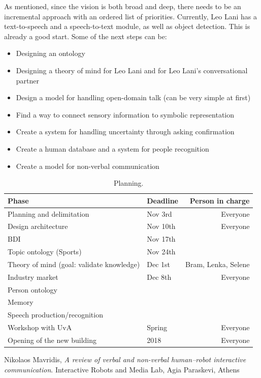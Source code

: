 \documentclass[a4paper]{article}
\begin{document}
As mentioned, since the vision is both broad and deep, there needs to be an incremental approach with an ordered list of priorities. Currently, Leo Lani has a text-to-speech and a speech-to-text module, as well as object detection. This is already a good start. Some of the next steps can be:
\begin{itemize}
\item Designing an ontology
\item Designing a theory of mind for Leo Lani and for Leo Lani's conversational partner
\item Design a model for handling open-domain talk (can be very simple at first)
\item Find a way to connect sensory information to symbolic representation
\item Create a system for handling uncertainty through asking confirmation
\item Create a human database and a system for people recognition 
\item Create a model for non-verbal communication


\end{itemize}
\begin{table}[h]
\centering
\begin{tabular}{|l|l|r|}
Phase & Deadline & Person in charge \\\hline
Planning and delimitation & Nov 3rd & Everyone  \\
Design architecture & Nov 10th & Everyone \\
BDI & Nov 17th & \\
Topic ontology (Sports) & Nov 24th & \\
Theory of mind (goal: validate knowledge) & Dec 1st & Bram, Lenka, Selene \\ 
Industry market & Dec 8th & Everyone \\
Person ontology & & \\
Memory & & \\
Speech production/recognition & & \\
Workshop with UvA & Spring &  Everyone \\
Opening of the new building & 2018 & Everyone \\
\end{tabular}
\caption{\label{tab:planning} Planning.}
\end{table}

\newpage

\begin{thebibliography}{9}
Nikolaos Mavridis, \emph{A review of verbal and non-verbal human–robot interactive communication}. Interactive Robots and Media Lab, Agia Paraskevi, Athens
\end{thebibliography}
\end{document}
